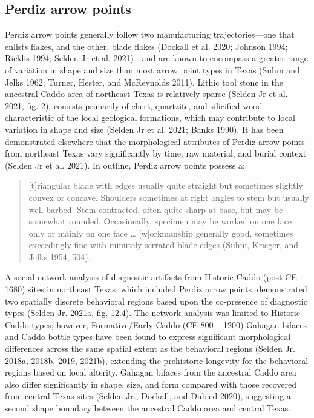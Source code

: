 \documentclass[smallextended]{svjour3}       %
\begin{document}
\hypertarget{perdiz-arrow-points}{%
\subsection{Perdiz arrow points}\label{perdiz-arrow-points}}

Perdiz arrow points generally follow two manufacturing
trajectories---one that enlists flakes, and the other, blade flakes
(Dockall et al. 2020; Johnson 1994; Ricklis 1994; Selden Jr et al.
2021)---and are known to encompass a greater range of variation in shape
and size than most arrow point types in Texas (Suhm and Jelks 1962;
Turner, Hester, and McReynolds 2011). Lithic tool stone in the ancestral
Caddo area of northeast Texas is relatively sparse (Selden Jr et al.
2021, fig. 2), consists primarily of chert, quartzite, and silicified
wood characteristic of the local geological formations, which may
contribute to local variation in shape and size (Selden Jr et al. 2021;
Banks 1990). It has been demonstrated elsewhere that the morphological
attributes of Perdiz arrow points from northeast Texas vary
significantly by time, raw material, and burial context (Selden Jr et
al. 2021). In outline, Perdiz arrow points possess a:

\begin{quote}
{[}t{]}riangular blade with edges usually quite straight but sometimes
slightly convex or concave. Shoulders sometimes at right angles to stem
but usually well barbed. Stem contracted, often quite sharp at base, but
may be somewhat rounded. Occasionally, specimen may be worked on one
face only or mainly on one face \ldots{} {[}w{]}orkmanship generally
good, sometimes exceedingly fine with minutely serrated blade edges
(Suhm, Krieger, and Jelks 1954, 504).
\end{quote}

A social network analysis of diagnostic artifacts from Historic Caddo
(post-CE 1680) sites in northeast Texas, which included Perdiz arrow
points, demonstrated two spatially discrete behavioral regions based
upon the co-presence of diagnostic types (Selden Jr. 2021a, fig. 12.4).
The network analysis was limited to Historic Caddo types; however,
Formative/Early Caddo (CE 800 -- 1200) Gahagan bifaces and Caddo bottle
types have been found to express significant morphological differences
across the same spatial extent as the behavioral regions (Selden Jr.
2018a, 2018b, 2019, 2021b), extending the prehistoric longevity for the
behavioral regions based on local alterity. Gahagan bifaces from the
ancestral Caddo area also differ significantly in shape, size, and form
compared with those recovered from central Texas sites (Selden Jr.,
Dockall, and Dubied 2020), suggesting a second shape boundary between
the ancestral Caddo area and central Texas.
\end{document}
